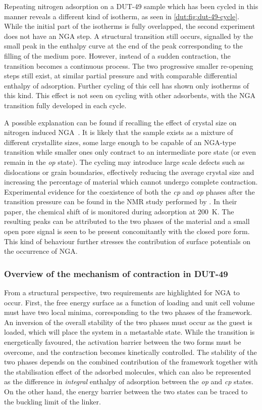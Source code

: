 Repeating nitrogen adsorption on a DUT-49 sample which has been
cycled in this manner reveals a different kind of isotherm, 
as seen in \autoref{dut:fig:dut-49-cycle}. While the initial 
part of the isotherms is fully overlapped,
the second experiment does not have an NGA step. 
A structural transition still occurs, 
signalled by the small peak in the enthalpy curve at the end of the 
peak corresponding to the filling of the medium pore. However, instead
of a sudden contraction, the transition becomes a continuous 
process. The two progressive smaller re-opening steps still exist,
at similar partial pressure and with comparable differential enthalpy
of adsorption. Further cycling of this cell has shown only isotherms
of this kind. This effect is not seen on cycling with other 
adsorbents, with the NGA transition fully developed in each cycle. 

A possible explanation can be found if recalling the effect 
of crystal size on nitrogen induced 
NGA~\cite{krauseEffectCrystalliteSize2018}. It is likely 
that the sample exists as a mixture of different crystallite
sizes, some large enough to be capable of an NGA-type transition 
while smaller ones only contract to an intermediate pore state
(or even remain in the \textit{op} state).
The cycling may introduce large scale defects such as dislocations
or grain boundaries, effectively reducing the average crystal size
and increasing the percentage of material which cannot undergo 
complete contraction. 
Experimental evidence for the coexistence of both the \textit{cp} and 
\textit{op} phases after the transition pressure can be found in the 
 NMR study performed 
by \citet{schaberSituMonitoringUnique2017}. In their paper,
the chemical shift of  is monitored during
adsorption at \SI{200}{\kelvin}. The resulting peaks can be attributed
to the two phases of the material and a small
open pore signal is seen to be present concomitantly with the 
closed pore form.
This kind of behaviour further stresses the 
contribution of surface potentials on the occurrence of NGA.

\subsubsection{Overview of the mechanism of contraction in DUT-49}

From a structural perspective, two requirements are 
highlighted for NGA to occur.
First, the free energy surface as a function of loading and 
unit cell volume must have two local minima, corresponding to the 
two phases of the framework. An inversion of the overall stability
of the two phases must occur as the guest is loaded, which will 
place the system in a metastable state. While the transition
is energetically favoured, the activation barrier between the 
two forms must be overcome, and the contraction becomes 
kinetically controlled. The stability of the two phases 
depends on the combined contribution of the framework together
with the stabilisation effect of the adsorbed molecules,
which can also be represented as the
difference in \textit{integral} enthalpy of adsorption between the 
\textit{op} and \textit{cp} states. On the other hand, the 
energy barrier between the two states can be traced to the 
buckling limit of the linker.
